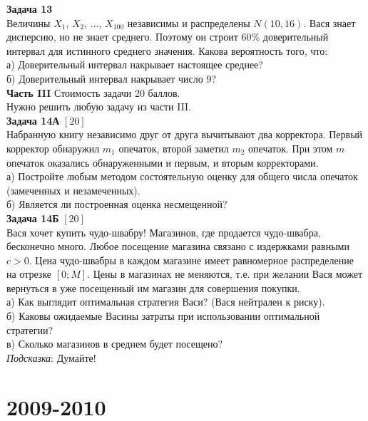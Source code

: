 \documentclass[12pt, a4paper]{article}\usepackage[]{graphicx}\usepackage[]{color}
\begin{document}
\textbf{Задача 13} \\
Величины $X_{1}$, $X_{2}$, ..., $X_{100}$ независимы и распределены $N(10,16)$. Вася знает дисперсию, но не знает среднего. Поэтому он строит 60\% доверительный интервал для истинного среднего значения. Какова вероятность того, что:\\
а) Доверительный интервал накрывает настоящее среднее? \\
б) Доверительный интервал накрывает число 9? \\

\textbf{Часть III} Стоимость задачи 20 баллов. \\

Нужно решить любую \textbf{} задачу из части III. \\


\textbf{Задача 14А} $[20]$ \\
Набранную книгу независимо друг от друга вычитывают два корректора. Первый корректор обнаружил $m_{1}$ опечаток, второй заметил $m_{2}$ опечаток. При этом $m$ опечаток оказались обнаруженными и первым, и вторым корректорами. \\
а) Постройте любым методом состоятельную оценку для общего числа опечаток (замеченных и незамеченных). \\
б) Является ли построенная оценка несмещенной? \\


\textbf{Задача 14Б} $[20]$ \\
Вася хочет купить чудо-швабру! Магазинов, где продается чудо-швабра, бесконечно много. Любое посещение магазина связано с издержками равными $c>0$. Цена чудо-швабры в каждом магазине имеет равномерное распределение на отрезке $[0;M]$. Цены в магазинах не меняются, т.е. при желании Вася может вернуться в уже посещенный им магазин для совершения покупки.\\
а) Как выглядит оптимальная стратегия Васи? (Вася нейтрален к риску). \\
б) Каковы ожидаемые Васины затраты при использовании оптимальной стратегии? \\
в) Сколько магазинов в среднем будет посещено? \\


\emph{Подсказка}: Думайте! \\





\section{2009-2010}
\end{document}
